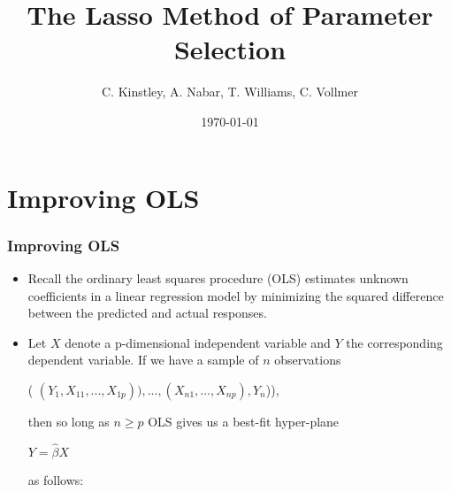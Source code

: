 \documentclass{beamer}
\title{The Lasso Method of Parameter Selection}
\author{C. Kinstley, A. Nabar, T. Williams, C. Vollmer }
\date{\today}
\begin{document}
\frame{\titlepage}

\section[Outline]{}
\frame{\tableofcontents}

\frame
{
\section[]{Improving OLS}
\frametitle{Improving OLS}
	\begin{itemize}
	\item Recall the ordinary least squares procedure (OLS) estimates unknown coefficients in a linear regression model by minimizing the \color{red} squared difference \color{black} between the \color{purple} predicted \color{black} and \color{blue} actual responses. \color{black}
	
	\item Let $X$ denote a p-dimensional independent variable and $Y$ the corresponding dependent variable. If we have a sample of $n$ observations
	
	\begin{center}(\color{blue} $(Y_{1},X_{11},...,X_{1p})),...,(X_{n1},...,X_{np}),Y_{n}$)\color{black}),\end{center}
	
	then so long as $n \geq p$ OLS gives us a best-fit hyper-plane
	
	\begin{center}\color{purple}$Y = \hat{\beta} X$ \end{center}
	as follows:
	\end{itemize} }
\frame
\end{document}
